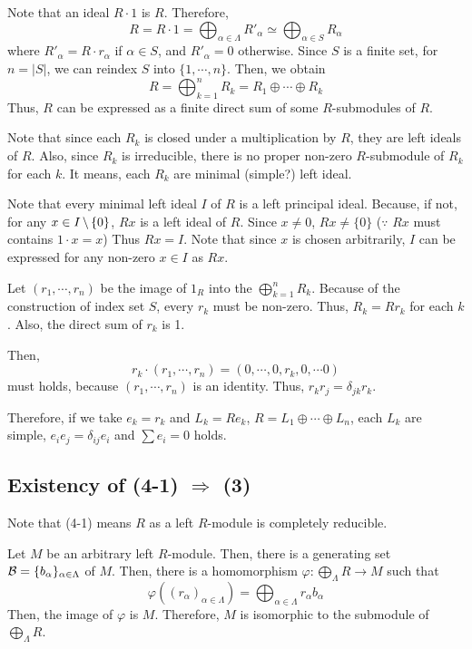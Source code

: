 Note that an ideal \(R \cdot 1\) is \(R\). Therefore,
\[R = R \cdot 1 = \bigoplus_{\alpha \in \Lambda} R'_\alpha \simeq \bigoplus_{\alpha \in S} R_\alpha\]
where \(R'_\alpha = R \cdot r_\alpha\) if \(\alpha \in S\), and \(R'_\alpha = 0\) otherwise.
Since \(S\) is a finite set,
for \(n = |S|\),
we can reindex \(S\) into \(\{1, \cdots, n\}\).
Then, we obtain
\[R = \bigoplus_{k=1}^n R_k = R_1 \oplus \cdots \oplus R_k\]
Thus, \(R\) can be expressed as a finite direct sum of some \(R\)-submodules
of \(R\).

Note that since each \(R_k\) is closed under a multiplication by \(R\),
they are left ideals of \(R\).
Also, since \(R_k\) is irreducible,
there is no proper non-zero \(R\)-submodule of \(R_k\) for each \(k\).
It means, each \(R_k\) are minimal (simple?) left ideal.

Note that every minimal left ideal \(I\) of \(R\) is a left principal ideal.
Because, if not, for any \(x \in I \,\backslash\, \{0\}\),
\(Rx\) is a left ideal of \(R\).
Since \(x \neq 0\), \(Rx \neq \{0\}\) (\(\because\) \(Rx\) must contains \(1 \cdot x = x\))
Thus \(Rx = I\).
Note that since \(x\) is chosen arbitrarily,
\(I\) can be expressed for any non-zero \(x \in I\) as \(Rx\).

Let \((r_1, \cdots, r_n)\) be the image of \(1_R\) into the \(\bigoplus_{k=1}^n R_k\).
Because of the construction of index set \(S\),
every \(r_k\) must be non-zero.
Thus, \(R_k = R r_k\) for each \(k\).
Also, the direct sum of \(r_k\) is 1.

Then, 
\[r_k \cdot (r_1, \cdots, r_n)
= (0, \cdots, 0, r_k, 0, \cdots 0)\]
must holds, because \((r_1, \cdots, r_n)\) is an identity.
Thus, \(r_k r_j = \delta_{jk} r_k\).

Therefore, if we take \(e_k = r_k\) and \(L_k = Re_k\),
\(R = L_1 \oplus \cdots \oplus L_n\),
each \(L_k\) are simple,
\(e_ie_j = \delta_{ij}e_i\)
and
\(\sum e_i = 0\) holds.
\qedsq

\subsection*{Existency of (4-1) \(\Rightarrow\) (3)}

Note that (4-1) means \(R\) as a left \(R\)-module is completely reducible.

Let \(M\) be an arbitrary left \(R\)-module.
Then, there is a generating set \(\mathcal{B} = \{b_\alpha\}_{\alpha \in \Lambda}\) 
of \(M\).
Then, there is a homomorphism \(\varphi: \bigoplus_\Lambda R \to M\) such that
\[\varphi((r_\alpha)_{\alpha \in \Lambda}) = \bigoplus_{\alpha \in \Lambda} r_\alpha b_\alpha\]
Then, the image of \(\varphi\) is \(M\).
Therefore, \(M\) is isomorphic to the submodule of \(\bigoplus_\Lambda R\).

